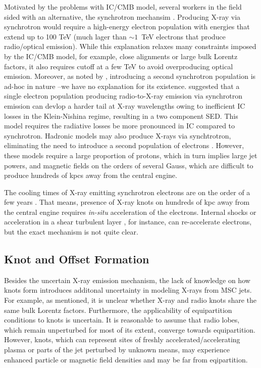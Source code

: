 Motivated by the problems with IC/CMB model, several workers in the field sided with an alternative, the synchrotron mechansim \citep[e.g.,][]{jester2006new,hardcastle2006testing,Clautice:2016zai}. Producing X-ray via synchrotron would require a high-energy electron population with energies that extend up to 100 TeV (much lager than $\sim1$~TeV electrons that produce radio/optical emission). While this explanation relaxes many constraints imposed by the IC/CMB model, for example, close alignments or large bulk Lorentz factors, it also requires cutoff at a few TeV to avoid overproducing optical emission. Moreover, as noted by \citep{schwartz2000chandra}, introducing a second synchrotron population is ad-hoc in nature  \citep{schwartz2000chandra}--we have no explanation for its existence. \citet{dermer2002x} suggested that a single electron population producing radio-to-X-ray emission via synchrotron emission can devlop a harder tail at X-ray wavelengths owing to inefficient IC losses in the Klein-Nishina regime, resulting in a two component SED. This model requires the radiative losses be more pronounced in IC compared to synchrotron.  Hadronic models may also produce X-rays via synchtrotron, eliminating the need to introduce a second population of electrons \citep[e.g.,][]{aharonian2002proton,petropoulou2017tev}. However, these models require a large proportion of protons, which in turn implies large jet powers,  and magnetic fields on the orders of several Gauss, which are difficult to produce hundreds of kpcs away from the central engine.

The cooling times of X-ray emitting synchrotron electrons are on the order of a few years \citep{harris2006x}. That means, presence of X-ray knots on hundreds of kpc away from the central engine requires \textit{in-situ} acceleration of the electrons. Internal shocks \citep[e.g.,][]{stawarz2004multiwavelength,kataoka2008chandra}  or acceleration in a shear turbulent layer \citep[e.g.,][]{ostrowski2002radiation}, for instance, can re-accelerate electrons, but the exact mechanism is not quite clear.


\subsection{Knot and Offset Formation}
Besides the uncertain X-ray emission mechanism, the lack of knowledge on how knots form introduces additonal uncertainty in modeling X-rays from MSC jets. For example, as mentioned, it is unclear whether X-ray and radio knots share the same bulk Lorentz factors. Furthermore, the applicability of equipartition conditions to knots is uncertain. It is reasonable to assume that radio lobes, which remain unperturbed for most of its extent, converge towards equipartition. However, knots, which can represent sites of freshly accelerated/accelerating plasma or parts of the jet perturbed by unknown means, may experience enhanced particle or magnetic field densities and may be far from eqipartition.

